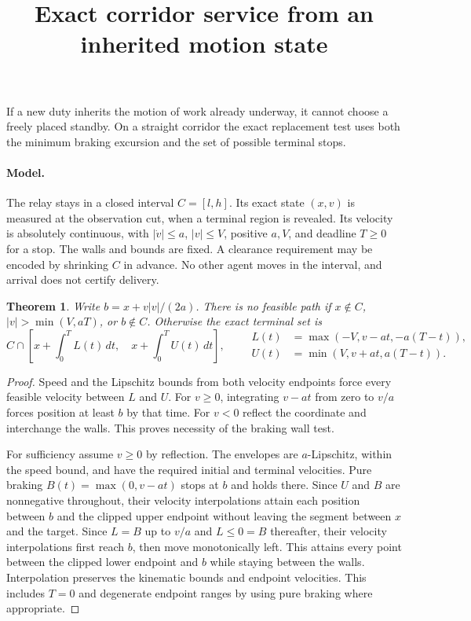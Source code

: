 \documentclass[11pt]{article}
\title{Exact corridor service from an inherited motion state}
\newtheorem{theorem}{Theorem}
\begin{document}
\maketitle

If a new duty inherits the motion of work already underway, it cannot
choose a freely placed standby. On a straight corridor the exact
replacement test uses both the minimum braking excursion and the set
of possible terminal stops.

\paragraph{Model.}
The relay stays in a closed interval \(C=[l,h]\). Its exact state
\((x,v)\) is measured at the observation cut, when a terminal region
is revealed. Its velocity is absolutely continuous, with
\(|\dot v|\le a\), \(|v|\le V\), positive \(a,V\), and deadline
\(T\ge0\) for a stop. The walls and bounds are fixed. A clearance
requirement may be encoded by shrinking \(C\) in advance. No other
agent moves in the interval, and arrival does not certify delivery.

\begin{theorem}
Write \(b=x+v|v|/(2a)\). There is no feasible path if \(x\notin C\),
\(|v|>\min(V,aT)\), or \(b\notin C\). Otherwise the exact terminal set is
\[
 C\cap\left[x+\int_0^T L(t)\,dt,\quad x+\int_0^T U(t)\,dt\right],
 \qquad
 \begin{aligned}
 L(t)&=\max(-V,v-at,-a(T-t)),\\
 U(t)&=\min(V,v+at,a(T-t)).
 \end{aligned}
\]
\end{theorem}
\begin{proof}
Speed and the Lipschitz bounds from both velocity endpoints force every
feasible velocity between \(L\) and \(U\). For \(v\ge0\), integrating
\(v-at\) from zero to \(v/a\) forces position at least \(b\) by that
time. For \(v<0\) reflect the coordinate and interchange the walls.
This proves necessity of the braking wall test.

For sufficiency assume \(v\ge0\) by reflection. The envelopes are
\(a\)-Lipschitz, within the speed bound, and have the required initial
and terminal velocities. Pure braking \(B(t)=\max(0,v-at)\) stops at
\(b\) and holds there. Since \(U\) and \(B\) are nonnegative throughout,
their velocity interpolations attain each position between \(b\) and
the clipped upper endpoint without leaving the segment between \(x\)
and the target. Since \(L=B\) up to \(v/a\) and \(L\le0=B\) thereafter,
their velocity interpolations first reach \(b\), then move monotonically
left. This attains every point between the clipped lower endpoint and
\(b\) while staying between the walls. Interpolation preserves the
kinematic bounds and endpoint velocities. This includes \(T=0\) and
degenerate endpoint ranges by using pure braking where appropriate.
\end{proof}
\end{document}
